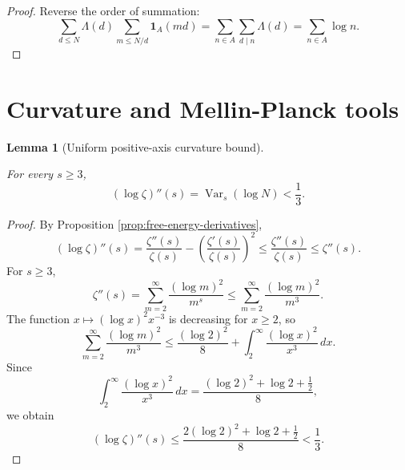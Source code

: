 \documentclass[11pt]{article}
\numberwithin{equation}{section}
\newtheorem{lemma}[theorem]{Lemma}
\theoremstyle{definition}
\theoremstyle{remark}
\DeclareMathOperator{\Var}{Var}
\newcommand{\1}{\mathbf 1}
\begin{document}
\begin{proof}
Reverse the order of summation:
\begin{equation}
\label{eq:finite-euler-score-proof}
\sum_{d\le N}\Lambda(d)\sum_{m\le N/d}\1_A(md)
=\sum_{n\in A}\sum_{d\mid n}\Lambda(d)
=\sum_{n\in A}\log n.
\end{equation}
\end{proof}

\section{Curvature and Mellin-Planck tools}

\begin{lemma}[Uniform positive-axis curvature bound]
\label{lem:uniform-positive-axis-curvature}



For every \(s\ge3\),
\begin{equation}
\label{eq:uniform-curvature-bound}
(\log\zeta)''(s)=\Var_s(\log N)<\frac13.
\end{equation}
\end{lemma}

\begin{proof}
By Proposition \ref{prop:free-energy-derivatives},
\begin{equation}
\label{eq:curvature-first-bound}
(\log\zeta)''(s)
=\frac{\zeta''(s)}{\zeta(s)}
-\left(\frac{\zeta'(s)}{\zeta(s)}\right)^2
\le \frac{\zeta''(s)}{\zeta(s)}
\le \zeta''(s).
\end{equation}
For \(s\ge3\),
\begin{equation}
\label{eq:zeta-second-derivative-bound}
\zeta''(s)=\sum_{m=2}^{\infty}\frac{(\log m)^2}{m^s}
\le\sum_{m=2}^{\infty}\frac{(\log m)^2}{m^3}.
\end{equation}
The function \(x\mapsto(\log x)^2x^{-3}\) is decreasing for \(x\ge2\), so
\begin{equation}
\label{eq:curvature-integral-comparison}
\sum_{m=2}^{\infty}\frac{(\log m)^2}{m^3}
\le
\frac{(\log2)^2}{8}
+\int_2^\infty\frac{(\log x)^2}{x^3}\,dx.
\end{equation}
Since
\begin{equation}
\label{eq:curvature-integral-value}
\int_2^\infty\frac{(\log x)^2}{x^3}\,dx
=\frac{(\log2)^2+\log2+\frac12}{8},
\end{equation}
we obtain
\begin{equation}
\label{eq:curvature-final-bound}
(\log\zeta)''(s)
\le
\frac{2(\log2)^2+\log2+\frac12}{8}
<\frac13.
\end{equation}
\end{proof}
\end{document}
